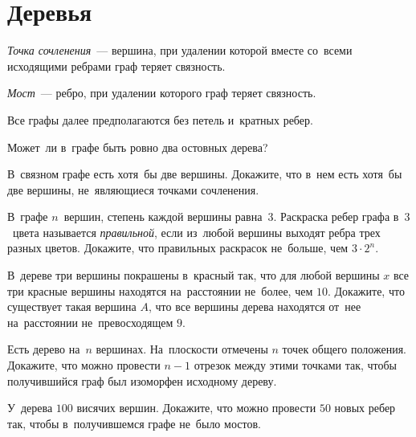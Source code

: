 
\section*{Деревья}


\emph{Точка сочленения}~--- вершина, при удалении которой вместе со~всеми
исходящими ребрами граф теряет связность.

\emph{Мост}~--- ребро, при удалении которого граф теряет связность.

Все графы далее предполагаются без петель и~кратных ребер.

\begin{problems}

\item
Может~ли в~графе быть ровно два остовных дерева?

\item
В~связном графе есть хотя~бы две вершины.
Докажите, что в~нем есть хотя~бы две вершины, не~являющиеся точками сочленения.

\item
В~графе $n$~вершин, степень каждой вершины равна~$3$.
Раскраска ребер графа в~$3$~цвета называется \emph{правильной}, если из~любой
вершины выходят ребра трех разных цветов.
Докажите, что правильных раскрасок не~больше, чем $3 \cdot 2^n$.

\item
В~дереве три вершины покрашены в~красный так, что для любой вершины $x$ все три
красные вершины находятся на~расстоянии не~более, чем $10$.
Докажите, что существует такая вершина $A$, что все вершины дерева находятся
от~нее на~расстоянии не~превосходящем $9$.

\item
Есть дерево на~$n$ вершинах.
На~плоскости отмечены $n$ точек общего положения.
Докажите, что можно провести $n-1$ отрезок между этими точками так, чтобы
получившийся граф был изоморфен исходному дереву.

\item
У~дерева $100$ висячих вершин.
Докажите, что можно провести $50$ новых ребер так, чтобы в~получившемся графе
не~было мостов.

\end{problems}

